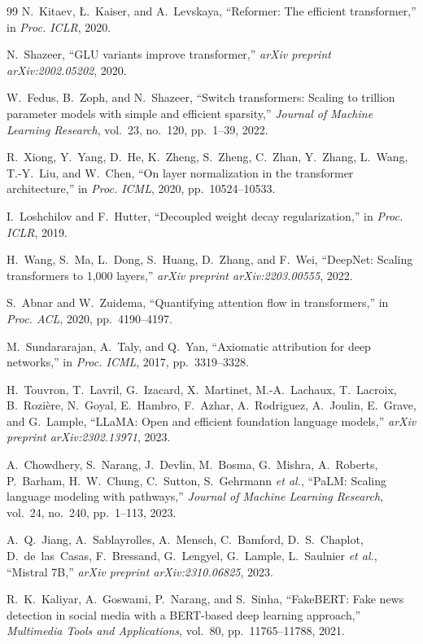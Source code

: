 \documentclass[conference]{IEEEtran}
\begin{document}
\begin{thebibliography}{99}
N.~Kitaev, \L.~Kaiser, and A.~Levskaya, ``Reformer: The efficient transformer,'' in \textit{Proc. ICLR}, 2020.

N.~Shazeer, ``GLU variants improve transformer,'' \textit{arXiv preprint arXiv:2002.05202}, 2020.

W.~Fedus, B.~Zoph, and N.~Shazeer, ``Switch transformers: Scaling to trillion parameter models with simple and efficient sparsity,'' \textit{Journal of Machine Learning Research}, vol.~23, no.~120, pp.~1--39, 2022.

R.~Xiong, Y.~Yang, D.~He, K.~Zheng, S.~Zheng, C.~Zhan, Y.~Zhang, L.~Wang, T.-Y.~Liu, and W.~Chen, ``On layer normalization in the transformer architecture,'' in \textit{Proc. ICML}, 2020, pp.~10524--10533.

I.~Loshchilov and F.~Hutter, ``Decoupled weight decay regularization,'' in \textit{Proc. ICLR}, 2019.

H.~Wang, S.~Ma, L.~Dong, S.~Huang, D.~Zhang, and F.~Wei, ``DeepNet: Scaling transformers to 1,000 layers,'' \textit{arXiv preprint arXiv:2203.00555}, 2022.

S.~Abnar and W.~Zuidema, ``Quantifying attention flow in transformers,'' in \textit{Proc. ACL}, 2020, pp.~4190--4197.

M.~Sundararajan, A.~Taly, and Q.~Yan, ``Axiomatic attribution for deep networks,'' in \textit{Proc. ICML}, 2017, pp.~3319--3328.

H.~Touvron, T.~Lavril, G.~Izacard, X.~Martinet, M.-A.~Lachaux, T.~Lacroix, B.~Rozi\`{e}re, N.~Goyal, E.~Hambro, F.~Azhar, A.~Rodriguez, A.~Joulin, E.~Grave, and G.~Lample, ``LLaMA: Open and efficient foundation language models,'' \textit{arXiv preprint arXiv:2302.13971}, 2023.

A.~Chowdhery, S.~Narang, J.~Devlin, M.~Bosma, G.~Mishra, A.~Roberts, P.~Barham, H.~W.~Chung, C.~Sutton, S.~Gehrmann \textit{et al.}, ``PaLM: Scaling language modeling with pathways,'' \textit{Journal of Machine Learning Research}, vol.~24, no.~240, pp.~1--113, 2023.

A.~Q.~Jiang, A.~Sablayrolles, A.~Mensch, C.~Bamford, D.~S.~Chaplot, D.~de~las~Casas, F.~Bressand, G.~Lengyel, G.~Lample, L.~Saulnier \textit{et al.}, ``Mistral 7B,'' \textit{arXiv preprint arXiv:2310.06825}, 2023.

R.~K.~Kaliyar, A.~Goswami, P.~Narang, and S.~Sinha, ``FakeBERT: Fake news detection in social media with a BERT-based deep learning approach,'' \textit{Multimedia Tools and Applications}, vol.~80, pp.~11765--11788, 2021.

\end{thebibliography}
\end{document}
